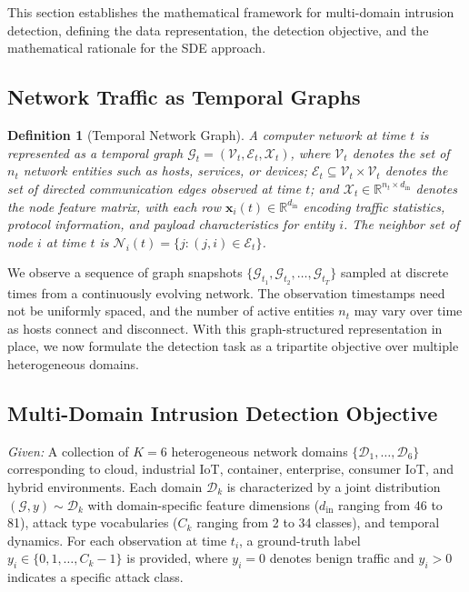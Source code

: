 \documentclass[journal]{IEEEtran}
\newcommand{\R}{\mathbb{R}}
\newcommand{\G}{\mathcal{G}}
\newcommand{\D}{\mathcal{D}}
\newcommand{\V}{\mathcal{V}}
\newcommand{\X}{\mathcal{X}}
\newtheorem{definition}{Definition}
\begin{document}
This section establishes the mathematical framework for multi-domain intrusion detection, defining the data representation, the detection objective, and the mathematical rationale for the SDE approach.

\subsection{Network Traffic as Temporal Graphs}

\begin{definition}[Temporal Network Graph]
\label{def:temporal_graph}
A computer network at time $t$ is represented as a temporal graph $\G_t = (\V_t, \mathcal{E}_t, \X_t)$, where $\V_t$ denotes the set of $n_t$ network entities such as hosts, services, or devices; $\mathcal{E}_t \subseteq \V_t \times \V_t$ denotes the set of directed communication edges observed at time $t$; and $\X_t \in \R^{n_t \times d_{\mathrm{in}}}$ denotes the node feature matrix, with each row $\mathbf{x}_i(t) \in \R^{d_{\mathrm{in}}}$ encoding traffic statistics, protocol information, and payload characteristics for entity $i$. The neighbor set of node $i$ at time $t$ is $\mathcal{N}_i(t) = \{j : (j, i) \in \mathcal{E}_t\}$.
\end{definition}

We observe a sequence of graph snapshots $\{\G_{t_1}, \G_{t_2}, \ldots, \G_{t_T}\}$ sampled at discrete times from a continuously evolving network. The observation timestamps need not be uniformly spaced, and the number of active entities $n_t$ may vary over time as hosts connect and disconnect. With this graph-structured representation in place, we now formulate the detection task as a tripartite objective over multiple heterogeneous domains.


\subsection{Multi-Domain Intrusion Detection Objective}

\textit{Given:} A collection of $K = 6$ heterogeneous network domains $\{\D_1, \ldots, \D_6\}$ corresponding to cloud, industrial IoT, container, enterprise, consumer IoT, and hybrid environments. Each domain $\D_k$ is characterized by a joint distribution $(\G, y) \sim \D_k$ with domain-specific feature dimensions ($d_{\mathrm{in}}$ ranging from 46 to 81), attack type vocabularies ($C_k$ ranging from 2 to 34 classes), and temporal dynamics. For each observation at time $t_i$, a ground-truth label $y_i \in \{0, 1, \ldots, C_k - 1\}$ is provided, where $y_i = 0$ denotes benign traffic and $y_i > 0$ indicates a specific attack class.
\end{document}

